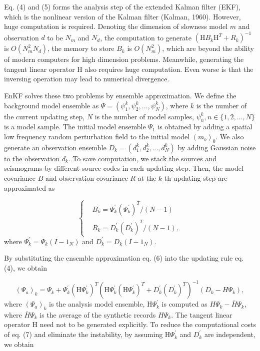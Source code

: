 \documentclass[mreferee]{gji}
\begin{document}
Eq. (4) and (5) forms the analysis step of the extended Kalman filter (EKF), which is the nonlinear version of the Kalman filter (Kalman, 1960). However, huge computation is required. Denoting the dimension of slowness model $m$ and observation $d$ to be $N_m$ and $N_d$, the computation to generate $(\mbox{H}B_k\mbox{H}^T+R_k)^{-1}$ is $O(N_m^2N_d)$, the memory to store $B_k$ is $O(N_m^2)$, which are beyond the ability of modern computers for high dimension problems. Meanwhile, generating the tangent linear operator H also requires huge computation. Even worse is that the inversing operation may lead to numerical divergence.

EnKF solves these two problems by ensemble approximation. We define the background model ensemble as $\Psi=(\psi_1^k,\psi_2^k,...,\psi_N^k)$, where $k$ is the number of the current updating step, $N$ is the number of model samples, $\psi_n^k, n\in\{1,2,...,N\}$ is a model sample. The initial model ensemble $\Psi_1$ is obtained by adding a spatial low frequency random perturbation field to the initial model $(m_b)_0$. We also generate an observation ensemble $D_k=(d_1^k,d_2^k,...,d_N^k)$ by adding Gaussian noise to the observation $d_k$. To save computation, we stack the sources and seismograms by different source codes in each updating step. Then, the model covariance $B$ and observation covariance $R$ at the $k$-th updating step are approximated as

\begin{equation}
\left\{
\begin{aligned}
& B_k=\Psi_k^{'}(\Psi_k^{'})^T/(N-1) \\
& R_k=D_k^{'}(D_k^{'})^T/(N-1),
\end{aligned}
\right.
\end{equation}
where $\Psi_k^{'}=\Psi_k(I-1_N)$ and $D_k^{'}=D_k(I-1_N)$.

By substituting the ensemble approximation eq. (6) into the updating rule eq. (4), we obtain

\begin{equation}
(\Psi_a)_k=\Psi_k+\Psi_k^{'}(\mbox{H}\Psi_k^{'})^T\left(\mbox{H}\Psi_k^{'}(\mbox{H}\Psi_k^{'})^T+D_k^{'}(D_k^{'})^T\right)^{-1}(D_k-H\Psi_k),
\end{equation}
where $(\Psi_a)_k$ is the analysis model ensemble, $\mbox{H}\Psi_k^{'}$ is computed as $H\Psi_k-\overline H\Psi_k$, where $\overline H\Psi_k$ is the average of the synthetic records $H\Psi_k$. The tangent linear operator H need not to be generated explicitly. To reduce the computational costs of eq. (7) and eliminate the instability, by assuming $\mbox{H}\Psi_k^{'}$ and $D_k^{'}$ are independent, we obtain
\end{document}
